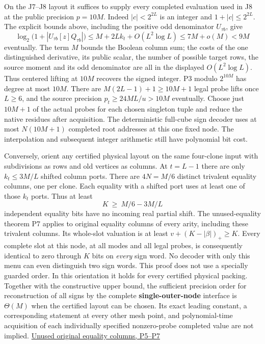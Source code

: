 \documentclass[
  11pt,
]{article}
\begin{document}
On the J7--J8 layout it suffices to supply every completed evaluation
used in J8 at the public precision \(p=10M\). Indeed \(|c|<2^{2L}\) is
an integer and \(1+|c|\le2^{2L}\). The explicit bounds above, including
the positive odd denominator \(U_{\tau b}\), give \[
 \log_2\bigl(1+|U_{\tau b}[z]Q_{\tau b}|\bigr)
       \le M+2L k_t+O(L^2\log L)
       \le 7M+o(M)<9M
\] eventually. The term \(M\) bounds the Boolean column sum; the costs
of the one distinguished derivative, its public scalar, the number of
possible target rows, the source moment and its odd denominator are all
in the displayed \(O(L^2\log L)\). Thus centered lifting at \(10M\)
recovers the signed integer. P3 modulo \(2^{10M}\) has degree at most
\(10M\). There are \(M(2L-1)+1\ge10M+1\) legal probe lifts once
\(L\ge6\), and the source precision \(p_t\ge24ML/u>10M\) eventually.
Choose just \(10M+1\) of the actual probes for each chosen singleton
tuple and reduce the native residues after acquisition. The
deterministic full-cube sign decoder uses at most \textbf{\(N(10M+1)\)}
completed root addresses at this one fixed node. The interpolation and
subsequent integer arithmetic still have polynomial bit cost.

Conversely, orient any certified physical layout on the same four-clone
input with subdivisions as rows and old vertices as columns. At
\(t=L-1\) there are only \(k_t\le3M/L\) shifted column ports. There are
\(4N=M/6\) distinct trivalent equality columns, one per clone. Each
equality with a shifted port uses at least one of those \(k_t\) ports.
Thus at least \[
                 K\ \ge\ M/6-3M/L
\] independent equality bits have no incoming real partial shift. The
unused-equality theorem P7 applies to original equality columns of every
arity, including these trivalent columns. Its whole-slot valuation is at
least \(v+(K-|\beta|)_+\ge K\). Every complete slot at this node, at all
modes and all legal probes, is consequently identical to zero through
\(K\) bits on \emph{every} sign word. No decoder with only this menu can
even distinguish two sign words. This proof does not use a specially
guarded order. In this orientation it holds for every certified physical
packing. Together with the constructive upper bound, the sufficient
precision order for reconstruction of all signs by the complete
\textbf{single-outer-node} interface is \(\Theta(M)\) when the certified
layout can be chosen. Its exact leading constant, a corresponding
statement at every other mesh point, and polynomial-time acquisition of
each individually specified nonzero-probe completed value are not
implied. \hyperref[v9-section-precision-frontier]{Unused original equality
columns, P5--P7}
\end{document}
